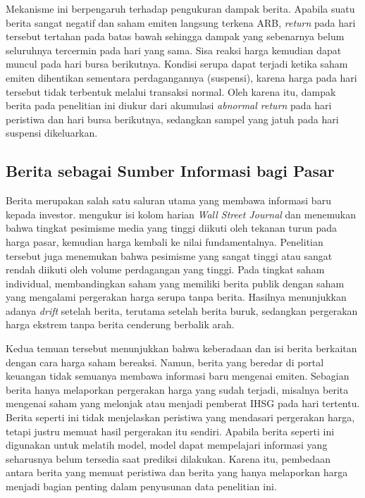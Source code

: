 Mekanisme ini berpengaruh terhadap pengukuran dampak berita. Apabila suatu berita sangat negatif dan saham emiten langsung terkena ARB, \emph{return} pada hari tersebut tertahan pada batas bawah sehingga dampak yang sebenarnya belum seluruhnya tercermin pada hari yang sama. Sisa reaksi harga kemudian dapat muncul pada hari bursa berikutnya. Kondisi serupa dapat terjadi ketika saham emiten dihentikan sementara perdagangannya (suspensi), karena harga pada hari tersebut tidak terbentuk melalui transaksi normal. Oleh karena itu, dampak berita pada penelitian ini diukur dari akumulasi \emph{abnormal return} pada hari peristiwa dan hari bursa berikutnya, sedangkan sampel yang jatuh pada hari suspensi dikeluarkan.

\subsection{Berita sebagai Sumber Informasi bagi Pasar}

Berita merupakan salah satu saluran utama yang membawa informasi baru kepada investor. \textcite{tetlock2007} mengukur isi kolom harian \emph{Wall Street Journal} dan menemukan bahwa tingkat pesimisme media yang tinggi diikuti oleh tekanan turun pada harga pasar, kemudian harga kembali ke nilai fundamentalnya. Penelitian tersebut juga menemukan bahwa pesimisme yang sangat tinggi atau sangat rendah diikuti oleh volume perdagangan yang tinggi. Pada tingkat saham individual, \textcite{chan2003} membandingkan saham yang memiliki berita publik dengan saham yang mengalami pergerakan harga serupa tanpa berita. Hasilnya menunjukkan adanya \emph{drift} setelah berita, terutama setelah berita buruk, sedangkan pergerakan harga ekstrem tanpa berita cenderung berbalik arah.

Kedua temuan tersebut menunjukkan bahwa keberadaan dan isi berita berkaitan dengan cara harga saham bereaksi. Namun, berita yang beredar di portal keuangan tidak semuanya membawa informasi baru mengenai emiten. Sebagian berita hanya melaporkan pergerakan harga yang sudah terjadi, misalnya berita mengenai saham yang melonjak atau menjadi pemberat IHSG pada hari tertentu. Berita seperti ini tidak menjelaskan peristiwa yang mendasari pergerakan harga, tetapi justru memuat hasil pergerakan itu sendiri. Apabila berita seperti ini digunakan untuk melatih model, model dapat mempelajari informasi yang seharusnya belum tersedia saat prediksi dilakukan. Karena itu, pembedaan antara berita yang memuat peristiwa dan berita yang hanya melaporkan harga menjadi bagian penting dalam penyusunan data penelitian ini.


